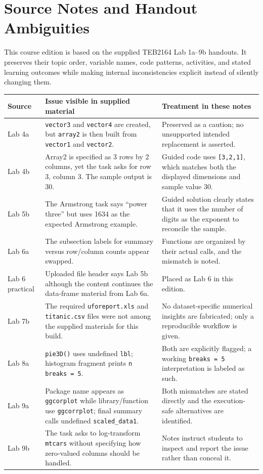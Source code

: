 \chapter*{Source Notes and Handout Ambiguities}

This course edition is based on the supplied TEB2164 Lab 1a--9b handouts. It preserves their topic order, variable names, code patterns, activities, and stated learning outcomes while making internal inconsistencies explicit instead of silently changing them.

\begin{dstable}
\begin{tabularx}{\linewidth}{@{}p{2.0cm}p{4.4cm}X@{}}
\toprule
\rowcolor{DSPaleBlue!92}
Source & Issue visible in supplied material & Treatment in these notes \\
\midrule
Lab 4a & \texttt{vector3} and \texttt{vector4} are created, but \texttt{array2} is then built from \texttt{vector1} and \texttt{vector2}. & Preserved as a caution; no unsupported intended replacement is asserted. \\
Lab 4b & Array2 is specified as 3 rows by 2 columns, yet the task asks for row 3, column 3. The sample output is 30. & Guided code uses \texttt{[3,2,1]}, which matches both the displayed dimensions and sample value 30. \\
Lab 5b & The Armstrong task says ``power three'' but uses 1634 as the expected Armstrong example. & Guided solution clearly states that it uses the number of digits as the exponent to reconcile the sample. \\
Lab 6a & The subsection labels for summary versus row/column counts appear swapped. & Functions are organized by their actual calls, and the mismatch is noted. \\
Lab 6 practical & Uploaded file header says Lab 5b although the content continues the data-frame material from Lab 6a. & Placed as Lab 6 in this edition. \\
Lab 7b & The required \texttt{uforeport.xls} and \texttt{titanic.csv} files were not among the supplied materials for this build. & No dataset-specific numerical insights are fabricated; only a reproducible workflow is given. \\
Lab 8a & \texttt{pie3D()} uses undefined \texttt{lbl}; histogram fragment prints \texttt{n breaks = 5}. & Both are explicitly flagged; a working \texttt{breaks = 5} interpretation is labeled as such. \\
Lab 9a & Package name appears as \texttt{ggcorplot} while library/function use \texttt{ggcorrplot}; final summary calls undefined \texttt{scaled\_data1}. & Both mismatches are stated directly and the execution-safe alternatives are identified. \\
Lab 9b & The task asks to log-transform \texttt{mtcars} without specifying how zero-valued columns should be handled. & Notes instruct students to inspect and report the issue rather than conceal it. \\
\bottomrule
\end{tabularx}
\end{dstable}

